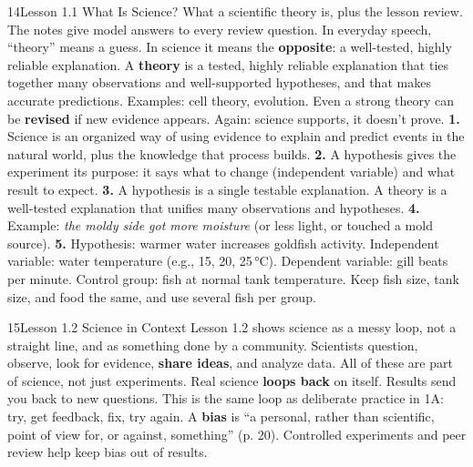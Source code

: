 \documentclass[11pt,letterpaper]{article}
\begin{document}
\begin{tbpage}{14}{Lesson 1.1 What Is Science?}
  {What a scientific theory is, plus the lesson review. The notes give model answers to every review question.}
    {In everyday speech, ``theory'' means a guess. In science it means the \textbf{opposite}: a well-tested, highly reliable explanation.}
    {A \textbf{theory} is a tested, highly reliable explanation that ties together many observations and well-supported hypotheses, and that makes accurate predictions. Examples: cell theory, evolution.}
    {Even a strong theory can be \textbf{revised} if new evidence appears. Again: science supports, it doesn't prove.}
    {\textbf{1.} Science is an organized way of using evidence to explain and predict events in the natural world, plus the knowledge that process builds. \textbf{2.} A hypothesis gives the experiment its purpose: it says what to change (independent variable) and what result to expect. \textbf{3.} A hypothesis is a single testable explanation. A theory is a well-tested explanation that unifies many observations and hypotheses.}
    {\textbf{4.} Example: \emph{the moldy side got more moisture} (or less light, or touched a mold source). \textbf{5.} Hypothesis: warmer water increases goldfish activity. Independent variable: water temperature (e.g., 15, 20, 25\,°C). Dependent variable: gill beats per minute. Control group: fish at normal tank temperature. Keep fish size, tank size, and food the same, and use several fish per group.}
\end{tbpage}

\begin{tbpage}{15}{Lesson 1.2 Science in Context}
  {Lesson 1.2 shows science as a messy loop, not a straight line, and as something done by a community.}
    {Scientists question, observe, look for evidence, \textbf{share ideas}, and analyze data. All of these are part of science, not just experiments.}
    {Real science \textbf{loops back} on itself. Results send you back to new questions. This is the same loop as deliberate practice in 1A: try, get feedback, fix, try again.}
    {A \textbf{bias} is ``a personal, rather than scientific, point of view for, or against, something'' (p. 20). Controlled experiments and peer review help keep bias out of results.}
\end{tbpage}
\end{document}
